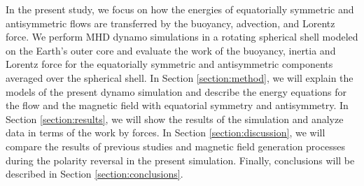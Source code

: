 In the present study, we focus on how the energies of equatorially symmetric and antisymmetric flows are transferred by the buoyancy, advection, and Lorentz force. 
We perform MHD dynamo simulations in a rotating spherical shell modeled on the Earth's outer core and evaluate the work of the buoyancy, inertia %
and Lorentz force for the equatorially symmetric and antisymmetric components averaged over the spherical shell. 
In Section \ref{section:method}, we will explain the models of the present dynamo simulation and describe the energy equations %
for the flow and the magnetic field with equatorial symmetry and antisymmetry.
In Section \ref{section:results}, we will show the results of the simulation and analyze data in terms of the work by forces. 
In Section \ref{section:discussion}, we will compare %
the results of previous studies and magnetic field generation processes during the polarity reversal in the present simulation. 
Finally, conclusions will be described in Section \ref{section:conclusions}.
